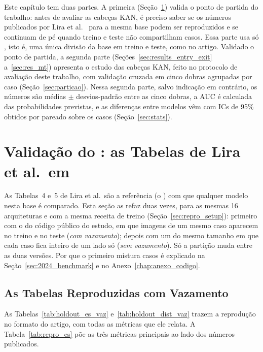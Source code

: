 \label{chap:results}

Este capítulo tem duas partes. A primeira (Seção~\ref{sec:res_holdout}) valida o ponto de partida do trabalho: antes de avaliar as cabeças \gls{KAN}, é preciso saber se os números publicados por Lira et al.~\cite{Lira2025deep} para a mesma base podem ser reproduzidos e se continuam de pé quando treino e teste não compartilham casos. Essa parte usa só , isto é, uma única divisão da base em treino e teste, como no artigo. Validado o ponto de partida, a segunda parte (Seções~\ref{sec:results_entry_exit} a~\ref{sec:res_mt}) apresenta o estudo das cabeças KAN, feito no protocolo de avaliação deste trabalho, com validação cruzada em cinco dobras agrupadas por caso (Seção~\ref{sec:particao}). Nessa segunda parte, salvo indicação em contrário, os números são médias $\pm$ desvios-padrão entre as cinco dobras, a \gls{AUC} é calculada das probabilidades previstas, e as diferenças entre modelos vêm com \glspl{IC} de 95\% obtidos por  pareado sobre os casos (Seção~\ref{sec:stats}).

\section{Validação do \texorpdfstring{}{Baseline}: as Tabelas de Lira et al.\ em \texorpdfstring{}{Hold-out}}
\label{sec:res_holdout}

As Tabelas~4 e~5 de Lira et al.\ são a referência (o ) com que qualquer modelo nesta base é comparado. Esta seção as refaz duas vezes, para as mesmas 16 arquiteturas e com a mesma receita de treino (Seção~\ref{sec:repro_setup}): primeiro com o  do código público do estudo, em que imagens de um mesmo caso aparecem no treino e no teste (\emph{com vazamento}); depois com um  do mesmo tamanho em que cada caso fica inteiro de um lado só (\emph{sem vazamento}). Só a partição muda entre as duas versões. Por que o primeiro  mistura casos é explicado na Seção~\ref{sec:2024_benchmark} e no Anexo~\ref{chap:anexo_codigo}.

\subsection{As Tabelas Reproduzidas com Vazamento}
\label{sec:res_holdout_vaz}

As Tabelas~\ref{tab:holdout_es_vaz} e~\ref{tab:holdout_dist_vaz} trazem a reprodução no formato do artigo, com todas as métricas que ele relata. A Tabela~\ref{tab:repro_es} põe as três métricas principais ao lado dos números publicados.

